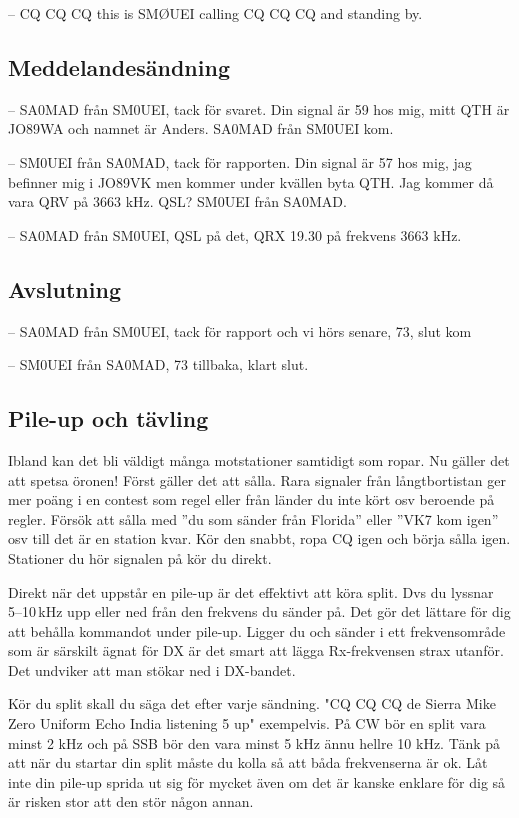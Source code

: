 -- CQ CQ CQ this is SMØUEI calling CQ CQ CQ and standing by.

\subsection{Meddelandesändning}

-- SA0MAD från SM0UEI, tack för svaret. Din signal är 59 hos mig, mitt QTH är
JO89WA och namnet är Anders. SA0MAD från SM0UEI kom.

-- SM0UEI från SA0MAD, tack för rapporten. Din signal är 57 hos mig, jag
befinner mig i JO89VK men kommer under kvällen byta QTH. Jag kommer då vara QRV
på 3663 kHz. QSL? SM0UEI från SA0MAD.

-- SA0MAD från SM0UEI, QSL på det, QRX 19.30 på frekvens 3663 kHz.

\subsection{Avslutning}

-- SA0MAD från SM0UEI, tack för rapport och vi hörs senare, 73, slut kom

-- SM0UEI från SA0MAD, 73 tillbaka, klart slut.

\subsection{Pile-up och tävling}

Ibland kan det bli väldigt många motstationer samtidigt som ropar. Nu
gäller det att spetsa öronen! Först gäller det att sålla. Rara
signaler från långtbortistan ger mer poäng i en contest som regel
eller från länder du inte kört osv beroende på regler. Försök att
sålla med ''du som sänder från Florida'' eller ''VK7 kom igen'' osv
till det är en station kvar. Kör den snabbt, ropa CQ igen och börja
sålla igen. Stationer du hör signalen på kör du direkt.

Direkt när det uppstår en pile-up är det effektivt att köra split. Dvs
du lyssnar 5--10\,kHz upp eller ned från den frekvens du sänder
på. Det gör det lättare för dig att behålla kommandot under
pile-up. Ligger du och sänder i ett frekvensområde som är särskilt
ägnat för DX är det smart att lägga Rx-frekvensen strax utanför. Det
undviker att man stökar ned i DX-bandet.

Kör du split skall du säga det efter varje sändning. "CQ CQ CQ de Sierra Mike
Zero Uniform Echo India listening 5 up" exempelvis. På CW bör en split vara
minst 2 kHz och på SSB bör den vara minst 5 kHz ännu hellre 10 kHz. Tänk på att
när du startar din split måste du kolla så att båda frekvenserna är ok. Låt inte
din pile-up sprida ut sig för mycket även om det är kanske enklare för dig så är
risken stor att den stör någon annan.

